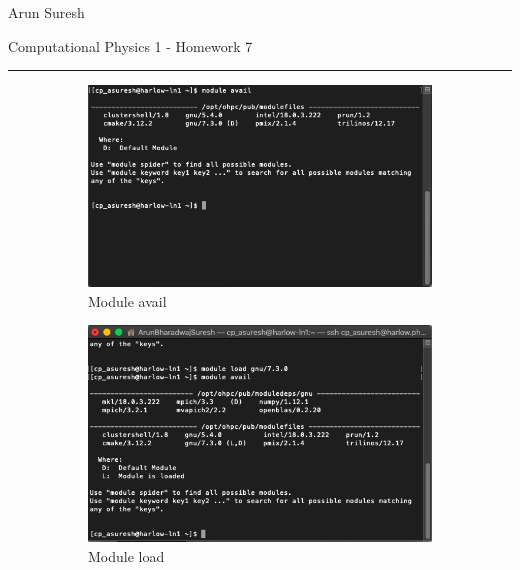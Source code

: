 \documentclass[12pt]{article}
\begin{document}
	Arun Suresh
	\begin{center}
		Computational Physics 1 - Homework 7
	\end{center} 
	{\rule{\linewidth}{0.1mm} }
	
	\begin{figure}[h]
		\centering
		\begin{subfigure}[h]{0.450\textwidth}
			\centering
			\includegraphics[width=\textwidth]{module_avail.png}
			\caption{Module avail}
		\end{subfigure}
		\begin{subfigure}[h]{0.450\textwidth}
			\centering
			\includegraphics[width=\textwidth]{module_load.png}
			\caption{Module load}
		\end{subfigure}
		\begin{subfigure}[h]{0.450\textwidth}
			\centering

\end{subfigure}
\end{figure}
\end{document}
